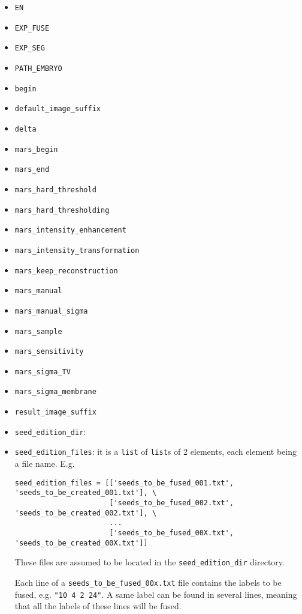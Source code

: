 \begin{itemize}
\itemsep -0.5ex
\item \texttt{EN}
\item \texttt{EXP\_FUSE}
\item \texttt{EXP\_SEG}
\item \texttt{PATH\_EMBRYO}
\item \texttt{begin}
\item \texttt{default\_image\_suffix}
\item \texttt{delta}
\item \texttt{mars\_begin}
\item \texttt{mars\_end}
\item \texttt{mars\_hard\_threshold}
\item \texttt{mars\_hard\_thresholding}
\item \texttt{mars\_intensity\_enhancement}
\item \texttt{mars\_intensity\_transformation}
\item \texttt{mars\_keep\_reconstruction}
\item \texttt{mars\_manual}
\item \texttt{mars\_manual\_sigma}
\item \texttt{mars\_sample}
\item \texttt{mars\_sensitivity}
\item \texttt{mars\_sigma\_TV}
\item \texttt{mars\_sigma\_membrane}
\item \texttt{result\_image\_suffix}
\item \texttt{seed\_edition\_dir}:
\item \texttt{seed\_edition\_files}: it is a \texttt{list} of \texttt{list}s of 2 elements, each element being a file name. E.g.
\begin{verbatim}
seed_edition_files = [['seeds_to_be_fused_001.txt', 'seeds_to_be_created_001.txt'], \
                      ['seeds_to_be_fused_002.txt', 'seeds_to_be_created_002.txt'], \
                      ...
                      ['seeds_to_be_fused_00X.txt', 'seeds_to_be_created_00X.txt']]
\end{verbatim}
These files are assumed to be located in the \texttt{seed\_edition\_dir} directory.

Each line of a \texttt{seeds\_to\_be\_fused\_00x.txt} file contains the labels to be fused, e.g. \texttt{"10 4 2 24"}. A same label can be found in several lines, meaning that all the labels of these lines will be fused.


\end{itemize}
